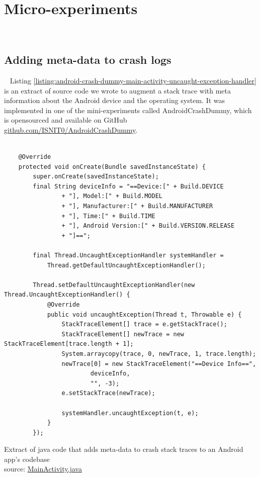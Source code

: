 \chapter{Micro-experiments}~\label{appendix-mini-experiments}

\section{Adding meta-data to crash logs}~\label{app-mini-experiment-meta-dat-to-crash-logs}
Listing \ref{listing:android-crash-dummy-main-activity-uncaught-exception-handler} is an extract of source code we wrote to augment a stack trace with meta information about the Android device and the operating system. It was implemented in one of the mini-experiments called AndroidCrashDummy, which is opensourced and available on GitHub \href{https://github.com/ISNIT0/AndroidCrashDummy}{github.com/ISNIT0/AndroidCrashDummy}.

\begin{listing}
\begin{verbatim}

    @Override
    protected void onCreate(Bundle savedInstanceState) {
        super.onCreate(savedInstanceState);
        final String deviceInfo = "==Device:[" + Build.DEVICE
                + "], Model:[" + Build.MODEL
                + "], Manufacturer:[" + Build.MANUFACTURER
                + "], Time:[" + Build.TIME
                + "], Android Version:[" + Build.VERSION.RELEASE
                + "]==";

        final Thread.UncaughtExceptionHandler systemHandler = 
            Thread.getDefaultUncaughtExceptionHandler();

        Thread.setDefaultUncaughtExceptionHandler(new Thread.UncaughtExceptionHandler() {
            @Override
            public void uncaughtException(Thread t, Throwable e) {
                StackTraceElement[] trace = e.getStackTrace();
                StackTraceElement[] newTrace = new StackTraceElement[trace.length + 1];
                System.arraycopy(trace, 0, newTrace, 1, trace.length);
                newTrace[0] = new StackTraceElement("==Device Info==",
                        deviceInfo,
                        "", -3);
                e.setStackTrace(newTrace);

                systemHandler.uncaughtException(t, e);
            }
        });
\end{verbatim}
\caption[Extract of java code that adds meta-data to crash stack traces to an Android app's codebase]{Extract of java code that adds meta-data to crash stack traces to an Android app's codebase\\source: \href{https://github.com/ISNIT0/AndroidCrashDummy/blob/master/app/src/main/java/com/example/user/androidtestapp/MainActivity.java}{MainActivity.java}}
\label{listing:android-crash-dummy-main-activity-uncaught-exception-handler}
\end{listing}

